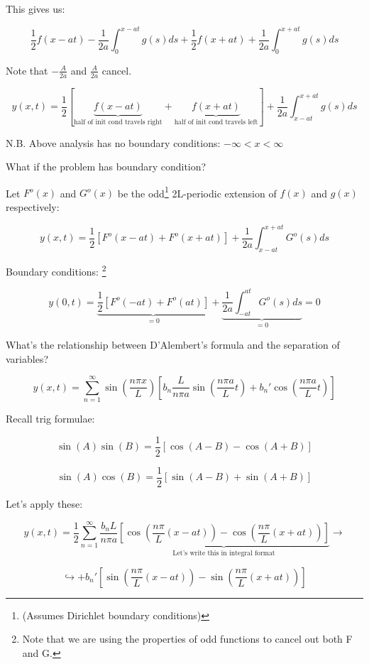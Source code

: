 \documentclass{article}
\begin{document}
This gives us:

$$\frac{1}{2} f(x-at) - \frac{1}{2a} \int_0^{x-at} g(s) ds + \frac{1}{2} f(x+at) + \frac{1}{2a} \int_0^{x+at} g(s) ds$$

Note that $- \frac{A}{2a}$ and $\frac{A}{2a}$ cancel. 

\begin{equation}
    y(x,t) = \frac{1}{2} \left[ \underbrace{f(x-at)}_{\text{half of init  cond travels right}} + \underbrace{f(x+at)}_{\text{half of init cond travels left}} \right] + \frac{1}{2a} \int_{x-at}^{x+at} g(s) ds
\end{equation}

N.B. Above analysis has no boundary conditions: $-\infty < x < \infty$

\hfill

What if the problem has boundary condition?

Let $F^o (x)$ and $G^o (x)$ be the odd\footnote{ (Assumes Dirichlet boundary conditions)} 2L-periodic extension of $f(x)$ and $g(x)$ respectively:

$$y(x,t) = \frac{1}{2} \left[ F^o (x-at) + F^o (x+at) \right] + \frac{1}{2a} \int_{x-at}^{x+at} G^o (s) ds$$

Boundary conditions: \footnote{Note that we are using the properties of odd functions to cancel out both F and G. }

$$y(0,t) = \underbrace{ \frac{1}{2} \left[ F^o (-at) + F^o (at) \right]}_{=0} + \underbrace{\frac{1}{2a} \int_{-at}^{at} G^o (s) ds}_{ = 0} = 0$$

What's the relationship between D'Alembert's formula and the separation of variables?

$$y(x,t) = \sum_{n = 1}^\infty \sin \left( \frac{n \pi x}{L} \right) \left[ b_n \frac{L}{n \pi a} \sin \left( \frac{n \pi a}{L}  t\right) + b_n' \cos \left( \frac{n \pi a}{L} t \right) \right]$$

Recall trig formulae:

$$\sin(A) \sin(B) = \frac{1}{2} \left[ \cos(A-B) - \cos(A+B) \right]$$

$$\sin(A) \cos(B) = \frac{1}{2} \left[ \sin(A-B) + \sin(A+B) \right]$$

Let's apply these:

$$y(x,t) = \frac{1}{2} \sum_{n  =1}^\infty \frac{b_n L}{n \pi a} \underbrace{\left[ \cos \left( \frac{n \pi}{L} (x-at) \right) - \cos \left( \frac{n \pi}{L} (x+at) \right) \right]}_{\text{Let's write this in integral format}} \rightarrow$$

$$\hookrightarrow + b_n' \left[ \sin \left( \frac{n \pi}{L} (x-at) \right) - \sin \left( \frac{n \pi}{L} (x+at) \right) \right]$$
\end{document}
